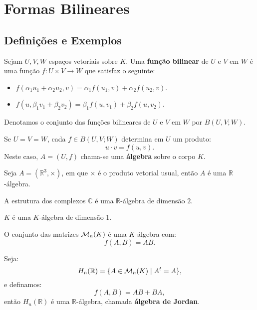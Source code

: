 \documentclass[11pt,twoside,a4paper]{book}
\begin{document}
\chapter{Formas Bilineares}

\section{Definições e Exemplos}

\begin{definicao}
Sejam $U,V,W$ espaços vetoriais sobre $K$. Uma \textbf{função bilinear} de $U$ e $V$ em $W$ é uma função $f:U\times V\rightarrow W$ que satisfaz o seguinte:
\begin{itemize}
\item $f(\alpha_1u_1+\alpha_2u_2,v)=\alpha_1f(u_1,v)+\alpha_2f(u_2,v)$.
\item $f(u,\beta_1v_1+\beta_2v_2)=\beta_1f(u,v_1)+\beta_2f(u,v_2)$.
\end{itemize}
Denotamos o conjunto das funções bilineares de $U$ e $V$ em $W$ por $B(U,V;W)$.
\end{definicao}

\begin{definicao}
Se $U=V=W$, cada $f\in B(U,V;W)$ determina em $U$ um produto:
\[
u\cdot v=f(u,v).
\]
Neste caso, $A=(U,f)$ chama-se uma \textbf{álgebra} sobre o corpo $K$.
\end{definicao}

\begin{exemplo}
Seja $A=(\mathbb{R}^3,\times)$, em que $\times$ é o produto vetorial usual, então $A$ é uma $\mathbb{R}$-álgebra.
\end{exemplo}

\begin{exemplo}
A estrutura dos complexos $\mathbb{C}$ é uma $\mathbb{R}$-álgebra de dimensão $2$.
\end{exemplo}

\begin{exemplo}
$K$ é uma $K$-álgebra de dimensão $1$.
\end{exemplo}

\begin{exemplo}
O conjunto das matrizes $\mathcal{M}_{n}(K)$ é uma $K$-álgebra com:
\[
f(A,B)=AB.
\]
\end{exemplo}

\begin{exemplo}
Seja:
\[
H_n(\mathbb{R})=\{A\in\mathcal{M}_{n}(K)\mid A^t=A\},
\]
e definamos:
\[
f(A,B)=AB+BA,
\]
então $H_n(\mathbb{R})$ é uma $\mathbb{R}$-álgebra, chamada \textbf{álgebra de Jordan}.
\end{exemplo}
\end{document}
